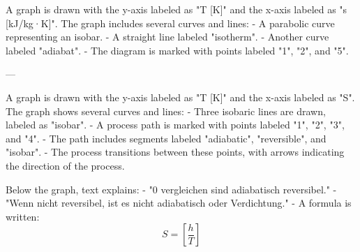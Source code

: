 A graph is drawn with the y-axis labeled as "T [K]" and the x-axis labeled as "s [kJ/kg·K]". The graph includes several curves and lines:  
- A parabolic curve representing an isobar.  
- A straight line labeled "isotherm".  
- Another curve labeled "adiabat".  
- The diagram is marked with points labeled "1", "2", and "5".  

---

A graph is drawn with the y-axis labeled as "T [K]" and the x-axis labeled as "S". The graph shows several curves and lines:  
- Three isobaric lines are drawn, labeled as "isobar".  
- A process path is marked with points labeled "1", "2", "3", and "4".  
- The path includes segments labeled "adiabatic", "reversible", and "isobar".  
- The process transitions between these points, with arrows indicating the direction of the process.  

Below the graph, text explains:  
- "0 vergleichen sind adiabatisch reversibel."  
- "Wenn nicht reversibel, ist es nicht adiabatisch oder Verdichtung."  
- A formula is written:  
  \[ S = \left[ \frac{h}{T} \right] \]